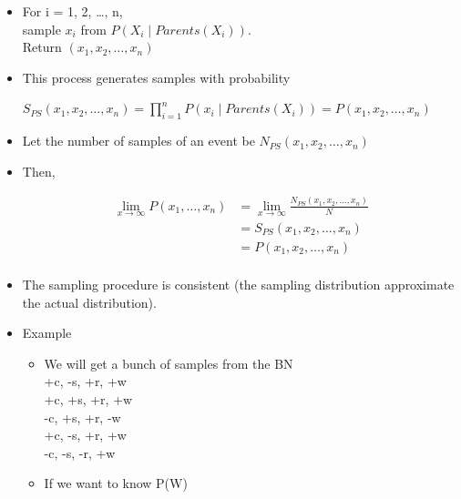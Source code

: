 \documentclass[11pt,a4paper]{report}
\begin{document}
\begin{itemize}
    \item For i = 1, 2, \ldots, n, \\
        sample $x_{i}$ from $P(X_{i} \mid Parents(X_{i}))$. \\
    
    Return $(x_{1}, x_{2}, \ldots, x_{n})$
    \item This process generates samples with probability
        \begin{center}
            $S_{PS}(x_{1}, x_{2},\ldots, x_{n}) = \prod_{i=1}^{n} P(x_{i} \mid Parents(X_{i})) = P(x_{1}, x_{2}, \ldots, x_{n})$
        \end{center}
    \item Let the number of samples of an event be $N_{PS}(x_{1}, x_{2}, \ldots, x_{n})$
    \item Then,
        \begin{center}
            \begin{equation}
                \begin{split}
                    \lim_{x \to \infty} P(x_{1}, \ldots, x_{n}) & =  \lim_{x \to \infty} \frac{N_{PS}(x_{1}, x_{2}, \ldots, x_{n})}{N} \\
                    & = S_{PS}(x_{1}, x_{2}, \ldots, x_{n}) \\
                    & = P(x_{1}, x_{2}, \ldots, x_{n}) \\
                \end{split}
            \end{equation}
        \end{center}
    \item The sampling procedure is consistent (the sampling distribution approximate the actual distribution).
    \item Example
        \begin{itemize}
            \item We will get a bunch of samples from the BN \\
                    +c, -s, +r, +w \\
                    +c, +s, +r, +w \\
                    -c, +s, +r, -w \\
                    +c, -s, +r, +w \\
                    -c, -s, -r, +w \\
            \item If we want to know P(W)
                \begin{itemize}

\end{itemize}
\end{itemize}
\end{itemize}
\end{document}
